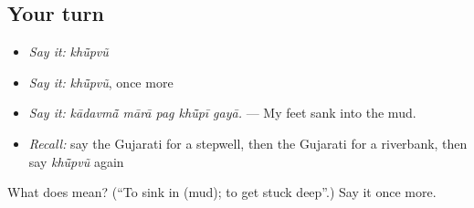 \subsection*{Your turn}
\begin{itemize}
\raggedright
  \item \emph{Say it:} \emph{khū̃pvũ}
  \item \emph{Say it:} \emph{khū̃pvũ}, once more
  \item \emph{Say it:} \emph{kādavmā̃ mārā pag khū̃pī gayā.} — My feet sank into the mud.
  \item \emph{Recall:} say the Gujarati for a stepwell, then the Gujarati for a riverbank, then say \emph{khū̃pvũ} again
\end{itemize}

\begin{tcolorbox}[breakable,colback=teal!4,colframe=teal!35!black,title={Before you move on}]
What does  mean? (\textquotedblleft{}To sink in (mud); to get stuck deep\textquotedblright{}.) Say it once more.
\end{tcolorbox}
